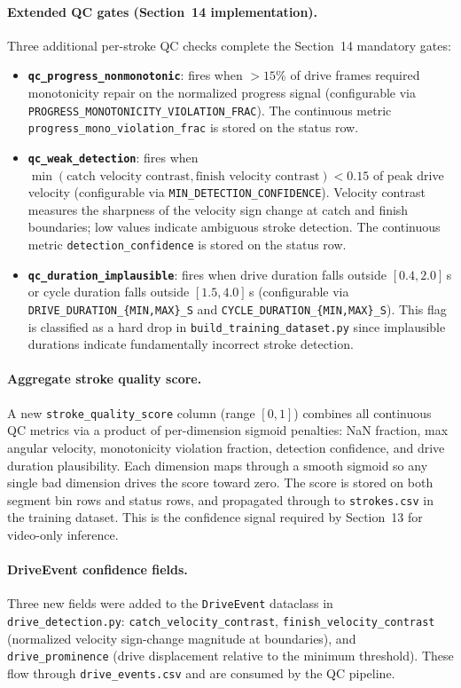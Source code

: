 \documentclass[11pt]{article}
\begin{document}
\paragraph{Extended QC gates (Section~14 implementation).}
Three additional per-stroke QC checks complete the Section~14 mandatory gates:
\begin{itemize}
	\item \textbf{\texttt{qc\_progress\_nonmonotonic}}: fires when $>15\%$ of drive frames required monotonicity repair on the normalized progress signal (configurable via \texttt{PROGRESS\_MONOTONICITY\_VIOLATION\_FRAC}). The continuous metric \texttt{progress\_mono\_violation\_frac} is stored on the status row.
	\item \textbf{\texttt{qc\_weak\_detection}}: fires when $\min(\text{catch velocity contrast}, \text{finish velocity contrast}) < 0.15$ of peak drive velocity (configurable via \texttt{MIN\_DETECTION\_CONFIDENCE}). Velocity contrast measures the sharpness of the velocity sign change at catch and finish boundaries; low values indicate ambiguous stroke detection. The continuous metric \texttt{detection\_confidence} is stored on the status row.
	\item \textbf{\texttt{qc\_duration\_implausible}}: fires when drive duration falls outside $[0.4, 2.0]$\,s or cycle duration falls outside $[1.5, 4.0]$\,s (configurable via \texttt{DRIVE\_DURATION\_\{MIN,MAX\}\_S} and \texttt{CYCLE\_DURATION\_\{MIN,MAX\}\_S}). This flag is classified as a hard drop in \texttt{build\_training\_dataset.py} since implausible durations indicate fundamentally incorrect stroke detection.
\end{itemize}

\paragraph{Aggregate stroke quality score.}
A new \texttt{stroke\_quality\_score} column (range $[0, 1]$) combines all continuous QC metrics via a product of per-dimension sigmoid penalties: NaN fraction, max angular velocity, monotonicity violation fraction, detection confidence, and drive duration plausibility. Each dimension maps through a smooth sigmoid so any single bad dimension drives the score toward zero. The score is stored on both segment bin rows and status rows, and propagated through to \texttt{strokes.csv} in the training dataset. This is the confidence signal required by Section~13 for video-only inference.

\paragraph{DriveEvent confidence fields.}
Three new fields were added to the \texttt{DriveEvent} dataclass in \texttt{drive\_detection.py}: \texttt{catch\_velocity\_contrast}, \texttt{finish\_velocity\_contrast} (normalized velocity sign-change magnitude at boundaries), and \texttt{drive\_prominence} (drive displacement relative to the minimum threshold). These flow through \texttt{drive\_events.csv} and are consumed by the QC pipeline.
\end{document}
